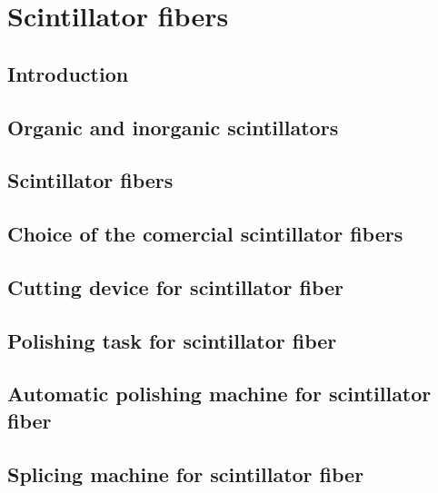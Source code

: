 \documentclass[12pt,a4paper]{book}
\begin{document}
\chapter{Scintillator fibers} \label{chap:GeneralFibers}

	\section{Introduction}\label{sec:IntroductionFibers}
	
	\section{Organic and inorganic scintillators}\label{sec:OrganicInorganicFibers}

	\section{Scintillator fibers}\label{sec:ScintillatorFibers}
	
	\section{Choice of the comercial scintillator fibers}\label{sec:ChoiceFiber}
	
	\section{Cutting device for scintillator fiber}\label{sec:CuttingFibers}
	
	\section{Polishing task for scintillator fiber}\label{sec:PolishingTask}

	\section{Automatic polishing machine for scintillator fiber}\label{sec:PolishingMachine}
	
	\section{Splicing machine for scintillator fiber}\label{sec:SplicingMachine}
	
\end{document}
